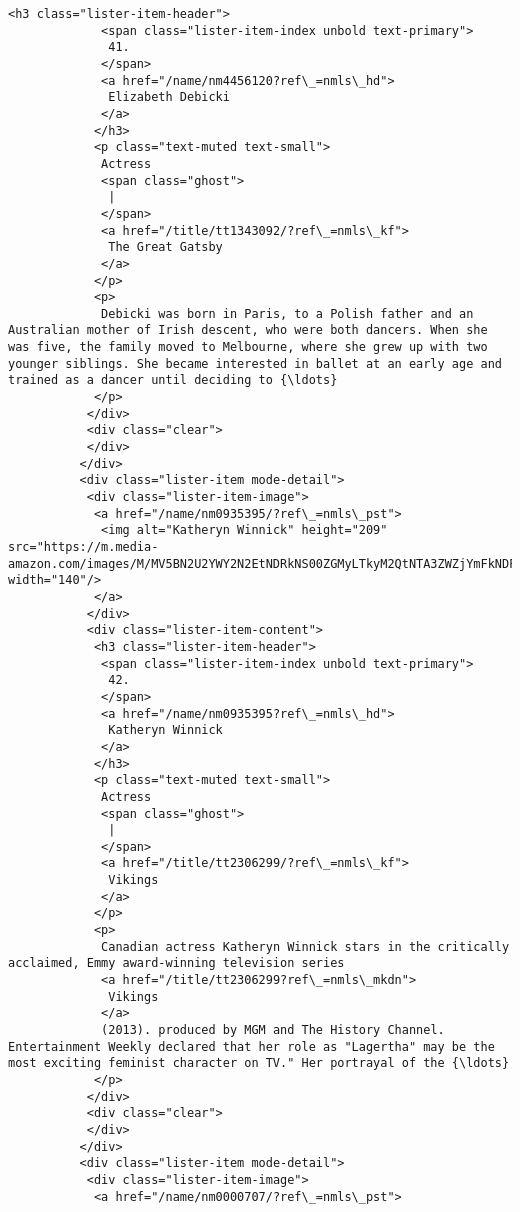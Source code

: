 \documentclass[11pt]{article}
\begin{document}
\begin{Verbatim}[commandchars=\\\{\}]
            <h3 class="lister-item-header">
             <span class="lister-item-index unbold text-primary">
              41.
             </span>
             <a href="/name/nm4456120?ref\_=nmls\_hd">
              Elizabeth Debicki
             </a>
            </h3>
            <p class="text-muted text-small">
             Actress
             <span class="ghost">
              |
             </span>
             <a href="/title/tt1343092/?ref\_=nmls\_kf">
              The Great Gatsby
             </a>
            </p>
            <p>
             Debicki was born in Paris, to a Polish father and an Australian mother of Irish descent, who were both dancers. When she was five, the family moved to Melbourne, where she grew up with two younger siblings. She became interested in ballet at an early age and trained as a dancer until deciding to {\ldots}
            </p>
           </div>
           <div class="clear">
           </div>
          </div>
          <div class="lister-item mode-detail">
           <div class="lister-item-image">
            <a href="/name/nm0935395/?ref\_=nmls\_pst">
             <img alt="Katheryn Winnick" height="209" src="https://m.media-amazon.com/images/M/MV5BN2U2YWY2N2EtNDRkNS00ZGMyLTkyM2QtNTA3ZWZjYmFkNDFkXkEyXkFqcGdeQXVyMTE1MzA3MTI@.\_V1\_UY209\_CR8,0,140,209\_AL\_.jpg" width="140"/>
            </a>
           </div>
           <div class="lister-item-content">
            <h3 class="lister-item-header">
             <span class="lister-item-index unbold text-primary">
              42.
             </span>
             <a href="/name/nm0935395?ref\_=nmls\_hd">
              Katheryn Winnick
             </a>
            </h3>
            <p class="text-muted text-small">
             Actress
             <span class="ghost">
              |
             </span>
             <a href="/title/tt2306299/?ref\_=nmls\_kf">
              Vikings
             </a>
            </p>
            <p>
             Canadian actress Katheryn Winnick stars in the critically acclaimed, Emmy award-winning television series
             <a href="/title/tt2306299?ref\_=nmls\_mkdn">
              Vikings
             </a>
             (2013). produced by MGM and The History Channel. Entertainment Weekly declared that her role as "Lagertha" may be the most exciting feminist character on TV." Her portrayal of the {\ldots}
            </p>
           </div>
           <div class="clear">
           </div>
          </div>
          <div class="lister-item mode-detail">
           <div class="lister-item-image">
            <a href="/name/nm0000707/?ref\_=nmls\_pst">

\end{Verbatim}
\end{document}
